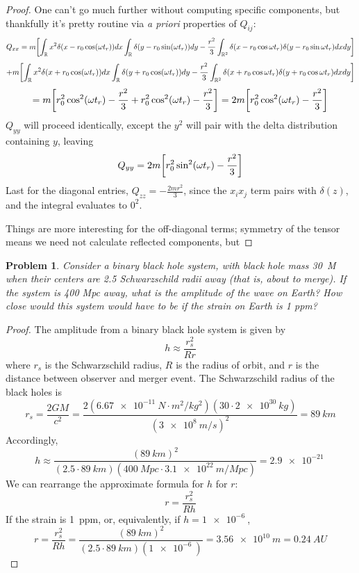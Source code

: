 \documentclass{article}
\newtheorem{prob}{Problem}
\begin{document}
\begin{proof}
  One can't go much further without computing specific components, but thankfully it's pretty routine via \textit{a priori} properties of $Q_{ij}$:
  \[
    Q_{xx} = m\qty[\int_{\mathbb{R}}x^{2}\delta(x - r_{0}\cos(\omega t_{r}))dx\int_{\mathbb{R}}\delta(y - r_{0}\sin(\omega t_{r}))dy
    - \frac{r^{2}}{3}\int_{\mathbb{R}^{2}}\delta(x - r_{0}\cos\omega t_{r})\delta(y - r_{0}\sin\omega t_{r})dxdy]
  \]
  \[
    + m\qty[\int_{\mathbb{R}}x^{2}\delta(x + r_{0}\cos(\omega t_{r}))dx\int_{\mathbb{R}}\delta(y + r_{0}\cos(\omega t_{r}))dy
    - \frac{r^{2}}{3}\int_{\mathbb{R}^{2}}\delta(x + r_{0}\cos\omega t_{r})\delta(y + r_{0}\cos\omega t_{r})dxdy]
  \]
  \[
    = m\qty[r_{0}^{2}\cos^{2}(\omega t_{r}) - \frac{r^{2}}{3} + r_{0}^{2}\cos^{2}(\omega t_{r}) - \frac{r^{2}}{3}]
    = 2m\qty[r_{0}^{2}\cos^{2}(\omega t_{r}) - \frac{r^{2}}{3}]
  \]
  $Q_{yy}$ will proceed identically, except the $y^{2}$ will pair with the delta distribution containing $y$, leaving
  \[
    Q_{yy} = 2m\qty[r_{0}^{2}\sin^{2}(\omega t_{r}) - \frac{r^{2}}{3}]
  \]
  Last for the diagonal entries, $Q_{zz} = -\frac{2mr^{2}}{3}$, since the $x_{i}x_{j}$ term pairs with $\delta(z)$, and the integral evaluates to $0^{2}$.

  Things are more interesting for the off-diagonal terms; symmetry of the tensor means we need not calculate reflected components, but

\end{proof}

\begin{prob}
  Consider a binary black hole system, with black hole mass \SI{30}{M_{\odot}} when their centers are 2.5 Schwarzschild radii away (that is, about to merge).
  If the system is 400 Mpc away, what is the amplitude of the wave on Earth?
  How close would this system would have to be if the strain on Earth is 1 ppm?
\end{prob}

\begin{proof}
  The amplitude from a binary black hole system is given by
  \[
    h \approx \frac{r_{s}^{2}}{Rr}
  \]
  where $r_{s}$ is the Schwarzschild radius, $R$ is the radius of orbit, and $r$ is the distance between observer and merger event.
  The Schwarzschild radius of the black holes is
  \[
    r_{s} = \frac{2GM}{c^{2}} = \frac{2(\SI{6.67e-11}{N\cdot m^{2}/kg^{2}})(30 \cdot \SI{2e30}{kg})}{(\SI{3e8}{m/s})^{2}}
    = \SI{89}{km}
  \]
  Accordingly,
  \[
    h \approx \frac{(\SI{89}{km})^{2}}{(2.5\cdot\SI{89}{km})(\SI{400}{Mpc} \cdot \SI{3.1e22}{m / Mpc})} = \SI{2.9e-21}{}
  \]
  We can rearrange the approximate formula for $h$ for $r$:
  \[
    r = \frac{r_{s}^{2}}{Rh}
  \]
  If the strain is \SI{1}{ppm}, or, equivalently, if $h = \SI{1e-6}{}$,
  \[
    r = \frac{r_{s}^{2}}{Rh} = \frac{(\SI{89}{km})^{2}}{(2.5\cdot \SI{89}{km})(\SI{1e-6}{})} = \SI{3.56e10}{m} = \SI{0.24}{AU}
  \]
\end{proof}
\end{document}
